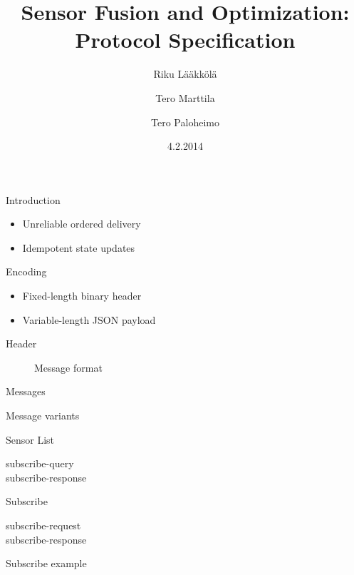 \documentclass{beamer}
\title[SFO protocol]{Sensor Fusion and Optimization: Protocol Specification}
\author{Riku Lääkkölä \and Tero Marttila \and Tero Paloheimo}
\institute{Aalto ELEC}
\date{4.2.2014}
\begin{document}
\begin{frame}
  \titlepage
\end{frame}

\begin{frame}{Introduction}
\begin{itemize}
	\item Unreliable ordered delivery
    \item Idempotent state updates
\end{itemize}
\end{frame}

\begin{frame}{Encoding}
\begin{itemize}
	\item Fixed-length binary header
    \item Variable-length JSON payload
\end{itemize}
\end{frame}

\begin{frame}{Header}
\begin{figure}
	{\scriptsize}
	\caption{Message format}
	\label{fig:header}
\end{figure}
\end{frame}

\begin{frame}{Messages}
\begin{table}
	\caption{Message variants}
	\label{tbl:messages}
\end{table}
\end{frame}

\begin{frame}{Sensor List}
\begin{description}
	\item[subscribe-query]
    \item[subscribe-response]
\end{description}
\end{frame}

\begin{frame}{Subscribe}
\begin{description}
	\item[subscribe-request]
    \item[subscribe-response]
\end{description}
\end{frame}

\begin{frame}{Subscribe example}
\begin{figure}
\end{figure}
\end{frame}
\end{document}
